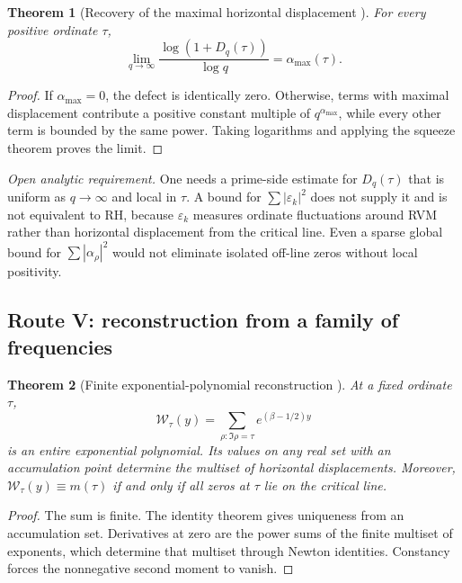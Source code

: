 \documentclass[11pt]{amsart}
\numberwithin{equation}{section}
\theoremstyle{plain}
\newtheorem{theorem}{Theorem}[section]
\theoremstyle{definition}
\theoremstyle{remark}
\newcommand{\1}{\mathbf{1}}
\begin{document}
\begin{theorem}[Recovery of the maximal horizontal displacement {}]
\label{thm:large_q_growth_exponent}
For every positive ordinate $\tau$,
\begin{equation}
\lim_{q\to\infty}
\frac{\log(1+D_q(\tau))}{\log q}
=
\alpha_{\max}(\tau).
\label{eq:large_q_growth_exponent}
\end{equation}
\end{theorem}

\begin{proof}
If $\alpha_{\max}=0$, the defect is identically zero.  Otherwise, terms
with maximal displacement contribute a positive constant multiple of
$q^{\alpha_{\max}}$, while every other term is bounded by the same power.
Taking logarithms and applying the squeeze theorem proves the limit.
\end{proof}

\medskip\noindent\emph{Open analytic requirement.} One needs a prime-side estimate for $D_q(\tau)$ that is uniform
as $q\to\infty$ and local in $\tau$.  A bound for
$\sum|\varepsilon_k|^2$ does not supply it and is not equivalent to RH,
because $\varepsilon_k$ measures ordinate fluctuations around RVM rather
than horizontal displacement from the critical line.  Even a sparse global
bound for $\sum|\alpha_\rho|^2$ would not eliminate isolated off-line zeros
without local positivity.

\subsection{Route V: reconstruction from a family of frequencies}
\label{subsec:route_family_q}


\begin{theorem}[Finite exponential-polynomial reconstruction {}]
\label{thm:q_family_reconstruction}
At a fixed ordinate $\tau$,
\begin{equation}
\mathcal W_\tau(y)
=
\sum_{\rho:\Im\rho=\tau}e^{(\beta-1/2)y}
\label{eq:q_family_exponential_polynomial}
\end{equation}
is an entire exponential polynomial.  Its values on any real set with an
accumulation point determine the multiset of horizontal displacements.
Moreover, $\mathcal W_\tau(y)\equiv m(\tau)$ if and only if all zeros at
$\tau$ lie on the critical line.
\end{theorem}

\begin{proof}
The sum is finite.  The identity theorem gives uniqueness from an
accumulation set.  Derivatives at zero are the power sums of the finite
multiset of exponents, which determine that multiset through Newton
identities.  Constancy forces the nonnegative second moment to vanish.
\end{proof}
\end{document}
